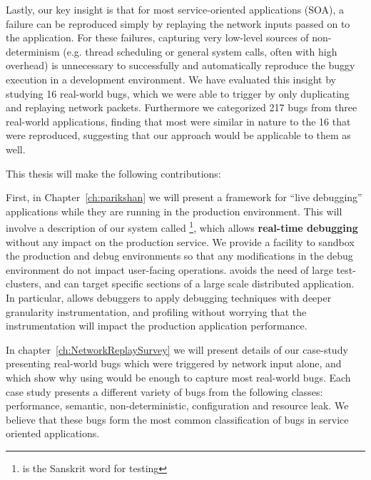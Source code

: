 Lastly, our key insight is that for most service-oriented applications (SOA), a failure can be reproduced simply by replaying the network inputs passed on to the application.
For these failures, capturing very low-level sources of non-determinism (e.g. thread scheduling or general system calls, often with high overhead) is unnecessary to successfully and automatically reproduce the buggy execution in a development environment. 
We have evaluated this insight by studying 16 real-world bugs, which we were able to trigger by only duplicating and replaying network packets.
Furthermore we categorized 217 bugs from three real-world applications, finding that most were similar in nature to the 16 that were reproduced, suggesting that our approach would be applicable to them as well.

\noindent This thesis will make the following contributions:

First, in Chapter~\ref{ch:parikshan} we will present a framework for ``live debugging'' applications while they are running in the production environment.
This will involve a description of our system called \parikshan\footnote{\parikshan is the Sanskrit word for  testing}, which allows \textbf{real-time debugging} without any impact on the production service.
We provide a facility to sandbox the production and debug environments so that any modifications in the debug environment do not impact user-facing operations.
\parikshan avoids the need of large test-clusters, and can target specific sections of a large scale distributed application.
In particular, \parikshan allows debuggers to apply debugging techniques with deeper granularity instrumentation, and profiling without worrying that the instrumentation will impact the production application performance.

In chapter~\ref{ch:NetworkReplaySurvey} we will present details of our case-study presenting real-world bugs which were triggered by network input alone, and which show why using \parikshan would be enough to capture most real-world bugs. 
Each case study presents a different variety of bugs from the following classes: performance, semantic, non-deterministic, configuration and resource leak. 
We believe that these bugs form the most common classification of bugs in service oriented applications.

